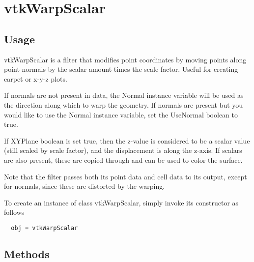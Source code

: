 \section{vtkWarpScalar}

\subsection{Usage}

 vtkWarpScalar is a filter that modifies point coordinates by moving
 points along point normals by the scalar amount times the scale factor.
 Useful for creating carpet or x-y-z plots.

 If normals are not present in data, the Normal instance variable will
 be used as the direction along which to warp the geometry. If normals are
 present but you would like to use the Normal instance variable, set the 
 UseNormal boolean to true.

 If XYPlane boolean is set true, then the z-value is considered to be 
 a scalar value (still scaled by scale factor), and the displacement is
 along the z-axis. If scalars are also present, these are copied through
 and can be used to color the surface.

 Note that the filter passes both its point data and cell data to
 its output, except for normals, since these are distorted by the
 warping.

To create an instance of class vtkWarpScalar, simply
invoke its constructor as follows
\begin{verbatim}
  obj = vtkWarpScalar
\end{verbatim}
\subsection{Methods}

